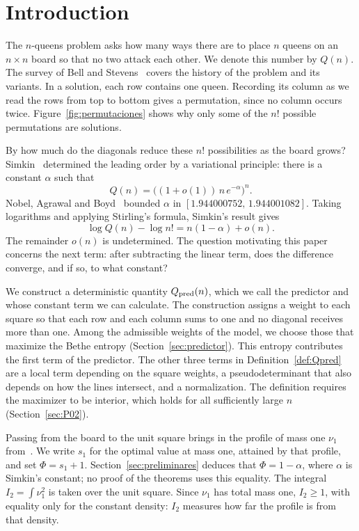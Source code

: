 \section{Introduction}\label{sec:intro}

The $n$-queens problem asks how many ways there are to place $n$ queens on an $n\times n$ board
so that no two attack each other. We denote this number by $Q(n)$. The survey of Bell and
Stevens~\cite{BellStevens} covers the history of the problem and its variants. In a solution, each row
contains one queen. Recording its column as we read the rows from top to bottom gives a
permutation, since no column occurs twice. Figure~\ref{fig:permutaciones} shows why only some of the $n!$
possible
permutations are solutions.



By how much do the diagonals reduce these $n!$ possibilities as the board grows?
Simkin~\cite[Theorem~1.1]{Simkin} determined the leading order by a variational principle:
there is a constant $\alpha$ such that
\[
 Q(n)=\bigl((1+o(1))\,n\,e^{-\alpha}\bigr)^n .
\]
Nobel, Agrawal and Boyd~\cite{NAB} bounded $\alpha$ in $[1.944000752,\,1.944001082]$.
Taking logarithms and applying Stirling's formula, Simkin's result gives
\[
 \log Q(n)-\log n!=n(1-\alpha)+o(n).
\]
The remainder $o(n)$ is undetermined. The question motivating this paper concerns the next term:
after subtracting the linear term, does the difference converge, and if so, to what constant?

We construct a deterministic quantity $Q_{\rm pred}(n)$, which we call the predictor and whose constant
term we can calculate. The construction assigns a weight to each square so that each row and
each column sums to one and no diagonal receives more than one. Among the admissible weights
of the model, we choose those that maximize the Bethe entropy (Section~\ref{sec:predictor}). This entropy
contributes the first term of the predictor. The other three terms in Definition~\ref{def:Qpred} are a
local term depending on the square weights, a pseudodeterminant that also depends on how the
lines intersect, and a normalization. The definition requires the maximizer to be interior,
which holds for all sufficiently large $n$ (Section~\ref{sec:P02}).

Passing from the board to the unit square brings in the profile of mass one $\nu_1$ from~\cite{Perfil}.
We write $s_1$ for the optimal value at mass one, attained by that profile, and set $\Phi=s_1+1$.
Section~\ref{sec:preliminares} deduces that $\Phi=1-\alpha$, where $\alpha$ is Simkin's constant;
no proof of the theorems uses this equality. The integral $I_2=\int\nu_1^2$ is taken over the unit square.
Since $\nu_1$ has total mass one,
$I_2\ge1$, with equality only for the constant density: $I_2$ measures how far the profile is from that
density.

